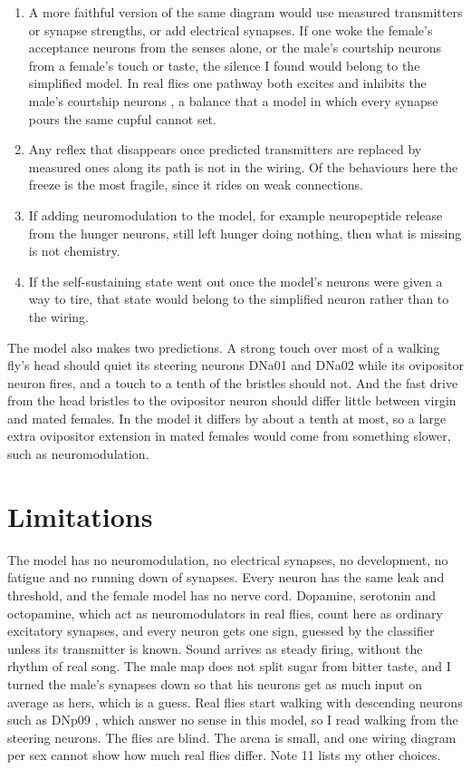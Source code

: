 \begin{enumerate}[leftmargin=*]
  \item A more faithful version of the same diagram would use measured transmitters or synapse strengths, or add electrical synapses. If one woke the female's acceptance neurons from the senses alone, or the male's courtship neurons from a female's touch or taste, the silence I found would belong to the simplified model. In real flies one pathway both excites and inhibits the male's courtship neurons \citep{clowney2015multimodal,kallman2015excitation}, a balance that a model in which every synapse pours the same cupful cannot set.
  \item Any reflex that disappears once predicted transmitters are replaced by measured ones along its path is not in the wiring. Of the behaviours here the freeze is the most fragile, since it rides on weak connections.
  \item If adding neuromodulation to the model, for example neuropeptide release from the hunger neurons, still left hunger doing nothing, then what is missing is not chemistry.
  \item If the self-sustaining state went out once the model's neurons were given a way to tire, that state would belong to the simplified neuron rather than to the wiring.
\end{enumerate}

The model also makes two predictions. A strong touch over most of a walking fly's head should quiet its steering neurons DNa01 and DNa02 while its ovipositor neuron fires, and a touch to a tenth of the bristles should not. And the fast drive from the head bristles to the ovipositor neuron should differ little between virgin and mated females. In the model it differs by about a tenth at most, so a large extra ovipositor extension in mated females would come from something slower, such as neuromodulation.

\section{Limitations}
\label{sec:limitations}

The model has no neuromodulation, no electrical synapses, no development, no fatigue and no running down of synapses. Every neuron has the same leak and threshold, and the female model has no nerve cord. Dopamine, serotonin and octopamine, which act as neuromodulators in real flies, count here as ordinary excitatory synapses, and every neuron gets one sign, guessed by the classifier unless its transmitter is known. Sound arrives as steady firing, without the rhythm of real song. The male map does not split sugar from bitter taste, and I turned the male's synapses down so that his neurons get as much input on average as hers, which is a guess. Real flies start walking with descending neurons such as DNp09 \citep{bidaye2020two}, which answer no sense in this model, so I read walking from the steering neurons. The flies are blind. The arena is small, and one wiring diagram per sex cannot show how much real flies differ. Note 11 lists my other choices.

